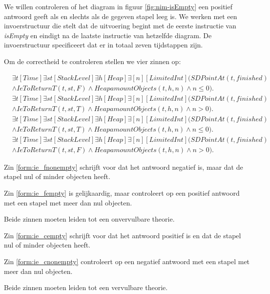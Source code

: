 We willen controleren of het diagram in figuur \ref{fig:nim-isEmpty} een positief antwoord geeft als en slechts als de gegeven stapel leeg is. We werken met een invoerstructuur die stelt dat de uitvoering begint met de eerste instructie van \textit{isEmpty} en eindigt na de laatste instructie van hetzelfde diagram. De invoerstructuur specificeert dat er in totaal zeven tijdstappen zijn.

Om de correctheid te controleren stellen we vier zinnen op:

\begin{align}
	\nonumber&\exists{t}[Time]\exists{st}[StackLevel]\exists{h}[Heap]\exists[n][LimitedInt](SDPointAt(t, finished) \\ &\land IeToReturnT(t, st, F) \land HeapamountObjects(t, h, n) \land n \leq 0).\label{form:ie_fnonempty} \\
	\nonumber&\exists{t}[Time]\exists{st}[StackLevel]\exists{h}[Heap]\exists[n][LimitedInt](SDPointAt(t, finished) \\ &\land IeToReturnT(t, st, T) \land HeapamountObjects(t, h, n) \land n > 0).\label{form:ie_fempty} \\
	\nonumber&\exists{t}[Time]\exists{st}[StackLevel]\exists{h}[Heap]\exists[n][LimitedInt](SDPointAt(t, finished) \\ &\land IeToReturnT(t, st, T) \land HeapamountObjects(t, h, n) \land n \leq 0).\label{form:ie_cempty} \\
	\nonumber&\exists{t}[Time]\exists{st}[StackLevel]\exists{h}[Heap]\exists[n][LimitedInt](SDPointAt(t, finished) \\ &\land IeToReturnT(t, st, F) \land HeapamountObjects(t, h, n) \land n > 0).\label{form:ie_cnonempty}
\end{align}

Zin \ref{form:ie_fnonempty} schrijft voor dat het antwoord negatief is, maar dat de stapel nul of minder objecten heeft.

Zin \ref{form:ie_fempty} is gelijkaardig, maar controleert op een positief antwoord met een stapel met meer dan nul objecten.

Beide zinnen moeten leiden tot een onvervulbare theorie.

Zin \ref{form:ie_cempty} schrijft voor dat het antwoord positief is en dat de stapel nul of minder objecten heeft.

Zin \ref{form:ie_cnonempty} controleert op een negatief antwoord met een stapel met meer dan nul objecten.

Beide zinnen moeten leiden tot een vervulbare theorie.

